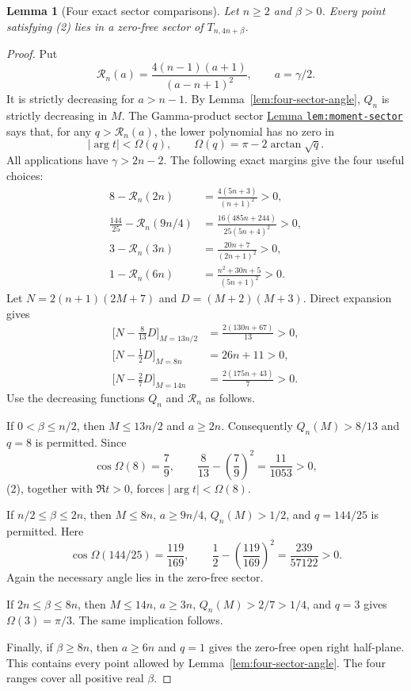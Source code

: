 \documentclass[11pt]{article}
\newtheorem{lemma}{Lemma}
\begin{document}
\begin{lemma}[Four exact sector comparisons]\label{lem:four-sector-bounds}
Let $n\ge2$ and $\beta>0$.  Every point satisfying (2) lies in a
zero-free sector of $T_{n,4n+\beta}$.
\end{lemma}
\begin{proof}
Put
\[
 \mathcal R_n(a)=\frac{4(n-1)(a+1)}{(a-n+1)^2},
 \qquad a=\gamma/2.
\]
It is strictly decreasing for $a>n-1$.  By
Lemma~\ref{lem:four-sector-angle}, $Q_n$ is strictly decreasing in $M$.
The Gamma-product sector
\href{LOWER_FIVE_QUADRATIC_SECTOR_SFC.tex}
{Lemma \texttt{lem:moment-sector}} says that, for any
$q>\mathcal R_n(a)$, the lower polynomial
has no zero in
\[
 |\arg t|<\Omega(q),\qquad
 \Omega(q)=\pi-2\arctan\sqrt q.
\]
All applications have $\gamma>2n-2$.  The following exact margins
give the four useful choices:
\[
\begin{aligned}
 8-\mathcal R_n(2n)
   &=\frac{4(5n+3)}{(n+1)^2}>0,\\
 \frac{144}{25}-\mathcal R_n(9n/4)
   &=\frac{16(485n+244)}{25(5n+4)^2}>0,\\
 3-\mathcal R_n(3n)
   &=\frac{20n+7}{(2n+1)^2}>0,\\
 1-\mathcal R_n(6n)
   &=\frac{n^2+30n+5}{(5n+1)^2}>0.
\end{aligned}                                                     \tag{4}
\]
Let $N=2(n+1)(2M+7)$ and $D=(M+2)(M+3)$.  Direct expansion gives
\[
\begin{aligned}
 \bigl[N-\tfrac8{13}D\bigr]_{M=13n/2}&=\frac{2(130n+67)}{13}>0,\\
 \bigl[N-\tfrac12D\bigr]_{M=8n}&=26n+11>0,\\
 \bigl[N-\tfrac27D\bigr]_{M=14n}&=\frac{2(175n+43)}7>0.
\end{aligned}                                                     \tag{5}
\]
Use the decreasing functions $Q_n$ and $\mathcal R_n$ as follows.

If $0<\beta\le n/2$, then $M\le13n/2$ and $a\ge2n$.
Consequently $Q_n(M)>8/13$ and $q=8$ is permitted.
Since
\[
 \cos\Omega(8)=\frac79,\qquad
 \frac8{13}-\left(\frac79\right)^2=\frac{11}{1053}>0,
\]
(2), together with $\Re t>0$, forces $|\arg t|<\Omega(8)$.

If $n/2\le\beta\le2n$, then $M\le8n$, $a\ge9n/4$,
$Q_n(M)>1/2$, and $q=144/25$ is permitted.  Here
\[
 \cos\Omega(144/25)=\frac{119}{169},\qquad
 \frac12-\left(\frac{119}{169}\right)^2
                    =\frac{239}{57122}>0.
\]
Again the necessary angle lies in the zero-free sector.

If $2n\le\beta\le8n$, then $M\le14n$, $a\ge3n$,
$Q_n(M)>2/7>1/4$, and $q=3$ gives
$\Omega(3)=\pi/3$.  The same implication follows.

Finally, if $\beta\ge8n$, then $a\ge6n$ and $q=1$ gives
the zero-free open right half-plane.  This contains every point
allowed by Lemma~\ref{lem:four-sector-angle}.
The four ranges cover all positive real $\beta$.
\end{proof}
\end{document}
